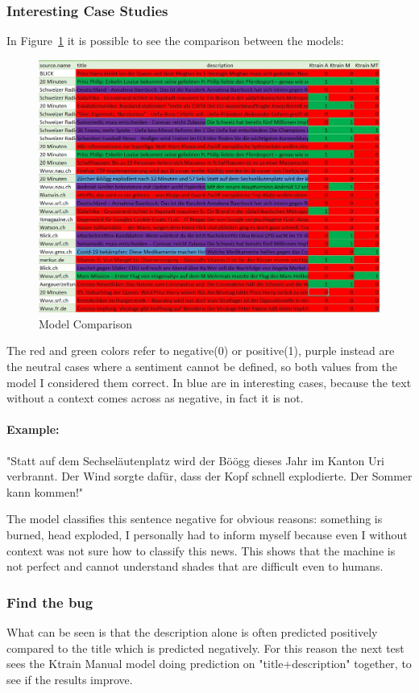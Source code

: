 \subsubsection{Interesting Case Studies}
In Figure~\ref{fig:fig_09} it is possible to see the comparison between the models: 
\begin{figure}[H]
\centering
\includegraphics[width=1\textwidth]{images/ktrainmanual.jpg}
\caption{Model Comparison}
\label{fig:fig_09}
\end{figure}
\FloatBarrier
The red and green colors refer to negative(0) or positive(1), purple instead are the neutral cases where a sentiment cannot be defined, so both values from the model I considered them correct.
In blue are in interesting cases, because the text without a context comes across as negative, in fact it is not.

\paragraph{Example:}
"Statt auf dem Sechseläutenplatz wird der Böögg dieses Jahr im Kanton Uri verbrannt. Der Wind sorgte dafür, dass der Kopf schnell explodierte. Der Sommer kann kommen!"

The model classifies this sentence negative for obvious reasons:
something is burned, head exploded, I personally had to inform myself because even I without context was not sure how to classify this news. This shows that the machine is not perfect and cannot understand shades that are difficult even to humans.

\subsubsection{Find the bug}
What can be seen is that the description alone is often predicted positively compared to the title which is predicted negatively.
For this reason the next test sees the Ktrain Manual model doing prediction on "title+description" together, to see if the results improve.

